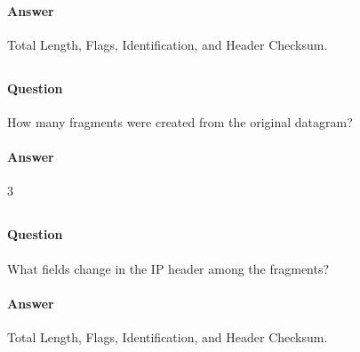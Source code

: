\documentclass[12pt,letterpaper]{article}
\begin{document}
\paragraph{Answer} Total Length, Flags, Identification, and Header Checksum.

\subsection{}
\paragraph{Question}
How many fragments were created from the original datagram?
\paragraph{Answer} 3





\label{15}
\subsection{}
\paragraph{Question}
What fields change in the IP header among the fragments?
\paragraph{Answer} Total Length, Flags, Identification, and Header Checksum.
\end{document}
